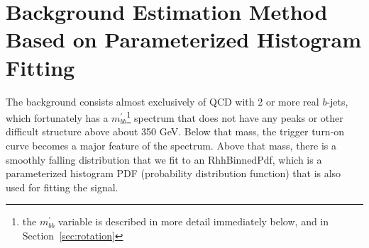 \section{Background Estimation Method Based on Parameterized Histogram Fitting}
The background consists almost exclusively of QCD with 2 or more real $b$-jets, which 
fortunately has a $m^{'}_{bb}$\footnote{the $m^{'}_{bb}$ variable is described in more detail
immediately below, and in Section~\ref{sec:rotation}} spectrum that does not have any peaks or other difficult
structure above about 350 GeV.  Below that mass, the trigger turn-on curve becomes
a major feature of the spectrum.  Above that mass, there
is a smoothly falling distribution that we fit to an RhhBinnedPdf, which is a parameterized
histogram PDF (probability distribution function) that is also used for fitting the signal.

